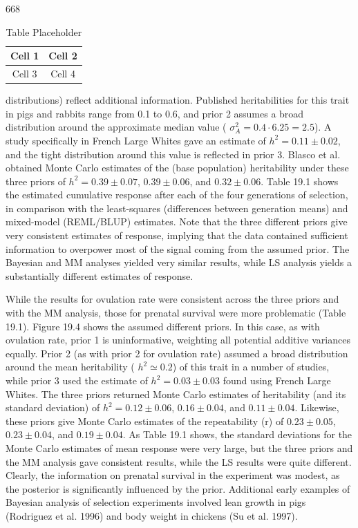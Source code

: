 \documentclass{article}
\begin{document}
668

\begin{table}[h]
\centering
\begin{tabular}{|c|c|}
\hline
Cell 1 & Cell 2 \\
\hline
Cell 3 & Cell 4 \\
\hline
\end{tabular}
\caption{Table Placeholder}
\end{table}

distributions) reflect additional information. Published heritabilities for this trait in pigs and rabbits range from 0.1 to 0.6, and prior 2 assumes a broad distribution around the approximate median value ( $ \sigma_A^2 = 0.4 \cdot 6.25 = 2.5 $). A study specifically in French Large Whites gave an estimate of  $ h^2 = 0.11 \pm 0.02 $, and the tight distribution around this value is reflected in prior 3. Blasco et al. obtained Monte Carlo estimates of the (base population) heritability under these three priors of  $ h^2 = 0.39 \pm 0.07 $,  $ 0.39 \pm 0.06 $, and  $ 0.32 \pm 0.06 $. Table 19.1 shows the estimated cumulative response after each of the four generations of selection, in comparison with the least-squares (differences between generation means) and mixed-model (REML/BLUP) estimates. Note that the three different priors give very consistent estimates of response, implying that the data contained sufficient information to overpower most of the signal coming from the assumed prior. The Bayesian and MM analyses yielded very similar results, while LS analysis yields a substantially different estimates of response.

While the results for ovulation rate were consistent across the three priors and with the MM analysis, those for prenatal survival were more problematic (Table 19.1). Figure 19.4 shows the assumed different priors. In this case, as with ovulation rate, prior 1 is uninformative, weighting all potential additive variances equally. Prior 2 (as with prior 2 for ovulation rate) assumed a broad distribution around the mean heritability ( $ h^2 \simeq 0.2 $) of this trait in a number of studies, while prior 3 used the estimate of  $ h^2 = 0.03 \pm 0.03 $ found using French Large Whites. The three priors returned Monte Carlo estimates of heritability (and its standard deviation) of  $ h^2 = 0.12 \pm 0.06 $,  $ 0.16 \pm 0.04 $, and  $ 0.11 \pm 0.04 $. Likewise, these priors give Monte Carlo estimates of the repeatability (r) of  $ 0.23 \pm 0.05 $,  $ 0.23 \pm 0.04 $, and  $ 0.19 \pm 0.04 $. As Table 19.1 shows, the standard deviations for the Monte Carlo estimates of mean response were very large, but the three priors and the MM analysis gave consistent results, while the LS results were quite different. Clearly, the information on prenatal survival in the experiment was modest, as the posterior is significantly influenced by the prior. Additional early examples of Bayesian analysis of selection experiments involved lean growth in pigs (Rodriguez et al. 1996) and body weight in chickens (Su et al. 1997).
\end{document}
